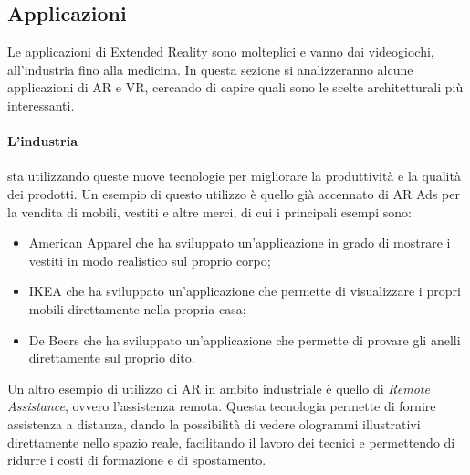     \subsection{Applicazioni}\label{subsec:XRapplicazioni}
        Le applicazioni di Extended Reality sono molteplici e vanno dai videogiochi, all'industria fino alla medicina. In questa sezione si analizzeranno alcune applicazioni di AR e VR, 
        cercando di capire quali sono le scelte architetturali più interessanti.
        \paragraph{L'industria} sta utilizzando queste nuove tecnologie per migliorare la produttività e la qualità dei prodotti. Un esempio di questo utilizzo è quello già
            accennato di AR Ads per la vendita di mobili, vestiti e altre merci, di cui i principali esempi sono:
            \begin{itemize}
                \item American Apparel che ha sviluppato un'applicazione in grado di mostrare i vestiti in modo realistico sul proprio corpo;
                \item IKEA che ha sviluppato un'applicazione che permette di visualizzare i propri mobili direttamente nella propria casa;
                \item De Beers che ha sviluppato un'applicazione che permette di provare gli anelli direttamente sul proprio dito.
            \end{itemize} 
            Un altro esempio di utilizzo di AR in ambito industriale è quello di \textit{Remote Assistance}, ovvero l'assistenza remota. Questa tecnologia permette di fornire 
            assistenza a distanza, dando la possibilità di vedere ologrammi illustrativi direttamente nello spazio reale, facilitando il lavoro dei tecnici e permettendo di 
            ridurre i costi di formazione e di spostamento.\\

